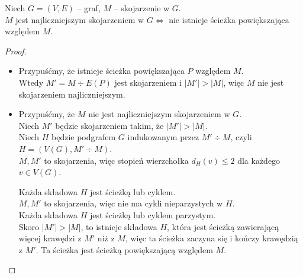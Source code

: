 \begin{obowiazkowy}
\begin{theorem}[Berge'a]
	Niech $G=(V,E)$ -- graf, $M$ -- skojarzenie w $G$. \\
	$M$ jest najliczniejszym skojarzeniem w $G \iff$ nie istnieje ścieżka powiększająca względem $M$.
\end{theorem}

\begin{proof} ~
\begin{itemize}
	\item[$\implies$]
	      Przypuśćmy, że istnieje ścieżka powiększająca $P$ względem $M$. \\
	      Wtedy $M' = M \div E(P)$ jest skojarzeniem i $|M'| > |M|$, więc $M$ nie jest skojarzeniem najliczniejszym.
	\item[$\impliedby$]
	      Przypuśćmy, że $M$ nie jest najliczniejszym skojarzeniem w $G$. \\
	      Niech $M'$ będzie skojarzeniem takim, że $|M'| > |M|$. \\
	      Niech $H$ będzie podgrafem $G$ indukowanym przez $M' \div M$, czyli $H = (V(G), M' \div M)$. \\
	      $M, M'$ to skojarzenia, więc stopień wierzchołka $d_H(v) \le 2$ dla każdego $v \in V(G)$.

	      Każda składowa $H$ jest ścieżką lub cyklem. \\
	      $M, M'$ to skojarzenia, więc nie ma cykli nieparzystych w $H$. \\
	      Każda składowa $H$ jest ścieżką lub cyklem parzystym. \\
	      Skoro $|M'| > |M|$, to istnieje składowa $H$, która jest ścieżką zawierającą więcej krawędzi z $M'$ niż z $M$, więc ta ścieżka zaczyna się i kończy krawędzią z $M'$. Ta ścieżka jest ścieżką powiększającą względem $M$.
\end{itemize}
\end{proof}
\end{obowiazkowy}
